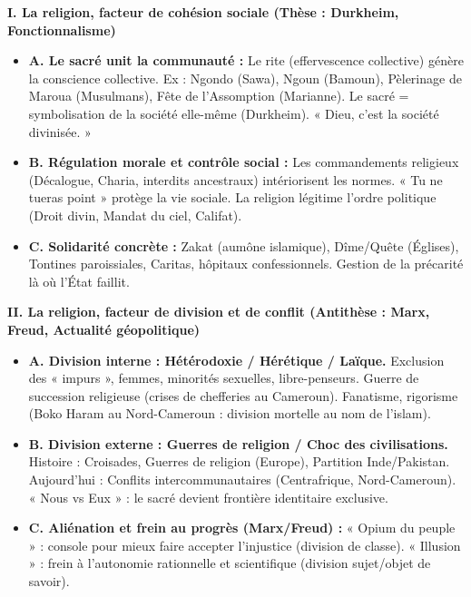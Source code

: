 \documentclass[11pt]{article}
\newcommand{\cle}[1]{{\popxbold\color{popdark}#1}}
\begin{document}
\begin{exoresolu}
\textbf{I. La religion, facteur de cohésion sociale (Thèse : Durkheim, Fonctionnalisme)}
\begin{itemize}
    \item \textbf{A. Le sacré unit la communauté :} Le rite (effervescence collective) génère la \cle{conscience collective}. Ex : Ngondo (Sawa), Ngoun (Bamoun), Pèlerinage de Maroua (Musulmans), Fête de l'Assomption (Marianne). Le sacré = \cle{symbolisation de la société elle-même} (Durkheim). « Dieu, c'est la société divinisée. »
    \item \textbf{B. Régulation morale et contrôle social :} Les commandements religieux (Décalogue, Charia, interdits ancestraux) intériorisent les normes. « Tu ne tueras point » protège la vie sociale. La religion légitime l'ordre politique (Droit divin, Mandat du ciel, Califat).
    \item \textbf{C. Solidarité concrète :} Zakat (aumône islamique), Dîme/Quête (Églises), Tontines paroissiales, Caritas, hôpitaux confessionnels. Gestion de la précarité là où l'État faillit.
\end{itemize}

\textbf{II. La religion, facteur de division et de conflit (Antithèse : Marx, Freud, Actualité géopolitique)}
\begin{itemize}
    \item \textbf{A. Division interne : Hétérodoxie / Hérétique / Laïque.} Exclusion des « impurs », femmes, minorités sexuelles, libre-penseurs. Guerre de succession religieuse (crises de chefferies au Cameroun). Fanatisme, rigorisme (Boko Haram au Nord-Cameroun : division mortelle au nom de l'islam).
    \item \textbf{B. Division externe : Guerres de religion / Choc des civilisations.} Histoire : Croisades, Guerres de religion (Europe), Partition Inde/Pakistan. Aujourd'hui : Conflits intercommunautaires (Centrafrique, Nord-Cameroun). « Nous vs Eux » : le sacré devient \cle{frontière identitaire} exclusive.
    \item \textbf{C. Aliénation et frein au progrès (Marx/Freud) :} « Opium du peuple » : console pour mieux faire accepter l'injustice (division de classe). « Illusion » : frein à l'autonomie rationnelle et scientifique (division sujet/objet de savoir).
\end{itemize}


\end{exoresolu}
\end{document}
